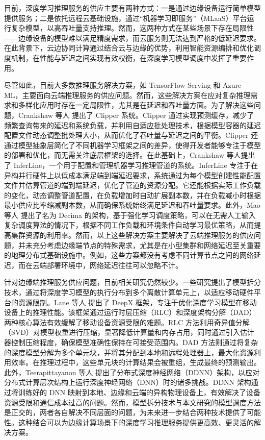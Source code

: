 目前，深度学习推理服务的供应主要有两种方式：一是通过边缘设备运行简单模型提供服务；二是依托远程云基础设施，通过“机器学习即服务”（MLaaS）平台运行复杂模型，以高吞吐量支持推理。然而，这两种方式在某些场景下存在局限性——边缘设备的模型难以满足精度需求，而云服务则无法达到严格的低延迟要求。在此背景下，云边协同计算通过结合云与边缘的优势，利用智能资源编排和优化调度机制，在性能与延迟之间实现有效权衡，在深度学习模型调度中发挥了重要作用。

尽管如此，目前大多数推理服务解决方案，如 TensorFlow Serving\cite{olston2017tensorflow} 和 Azure ML\cite{chappell2015introducing}，主要面向云端推理服务的供应问题。然而，这些解决方案在应对复杂推理需求和多样化应用时存在一定局限性，尤其是在延迟和吞吐量方面。为了解决这些问题，Crankshaw 等人\cite{crankshaw2017clipper} 提出了 Clipper 系统。Clipper 通过实现预测缓存，减少了频繁查询带来的延迟和系统负载，并利用自适应批处理技术，根据模型容器的延迟配置文件动态调整批处理大小，从而优化了吞吐量与延迟之间的平衡。Clipper 还通过模型抽象层简化了不同机器学习框架之间的差异，使得开发者能够专注于模型的部署和优化，而无需关注底层框架的选择。在此基础上，Crankshaw 等人\cite{crankshaw2020inferline}提出了 InferLine，一个用于配置和管理机器学习推理管道的系统。InferLine 专注于在异构并行硬件上以低成本满足端到端延迟要求，系统通过为每个模型创建性能配置文件并估算管道的端到端延迟，优化了管道的资源分配。它还能根据实际工作负载的变化，动态调整管道配置，在负载增加时自动扩展副本数，并在负载减小时根据最小供应比率缩减副本数，从而确保系统始终满足延迟和吞吐量要求。此外，Mao 等人\cite{mao2019learning} 提出了名为 Decima 的架构，基于强化学习调度策略，可以在无需人工输入复杂调度算法的情况下，根据不同工作负载和环境条件自动学习最优策略，从而提高集群资源的利用率。然而，以上这些解决方案主要解决了云端推理服务的供应问题，并未充分考虑边缘端节点的特殊需求，尤其是在小型集群和网络延迟至关重要的地理分布式基础设施中。例如，这些方案都没有考虑不同计算节点之间的网络延迟，而在云端部署环境中，网络延迟往往可以忽略不计。

针对边缘端推理服务供应问题，目前相关研究仍然较少。一些研究提出了模型拆分技术，通过将深度学习模型的执行分布到多个离散计算单元上，以适应移动硬件平台的资源限制。Lane 等人\cite{lane2016deepx} 提出了 DeepX 框架，专注于优化深度学习模型在移动设备上的推理性能。该框架通过运行时层压缩（RLC）和深度架构分解（DAD）两种核心算法有效缓解了移动设备资源受限的难题。RLC 方法利用奇异值分解（SVD）对模型权重进行压缩，显著降低计算量和内存占用，同时通过引入估计器控制压缩程度，确保模型准确性保持在可接受范围内。DAD 方法则通过将复杂的深度模型分解为多个单元块，并将其分配到本地和远程处理器上，最大化资源利用效率。在推理过程中，这些单元块的计算结果会被重组，生成最终的预测输出。此外，Teerapittayanon 等人\cite{teerapittayanon2017distributed} 提出了分布式深度神经网络（DDNN）架构，以应对分布式计算层次结构上运行深度神经网络（DNN）时的诸多挑战。DDNN 架构通过将训练好的 DNN 映射到本地、边缘和云端的异构物理设备上，有效解决了设备资源受限和通信成本过高的问题。然而，模型拆分技术与本文研究的模型调度方法是正交的，两者各自解决不同层面的问题，为未来进一步结合两种技术提供了可能性。这种结合可以为边缘计算场景下的深度学习推理服务提供更高效、更灵活的解决方案。

